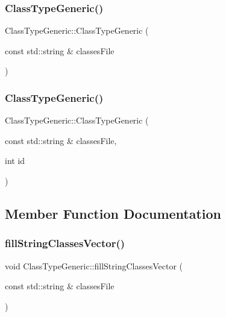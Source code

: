 \subsubsection{\texorpdfstring{Class\+Type\+Generic()}{ClassTypeGeneric()}\hspace{0.1cm}{\footnotesize\ttfamily [1/2]}}
{\footnotesize\ttfamily Class\+Type\+Generic\+::\+Class\+Type\+Generic (\begin{DoxyParamCaption}\item[{const std\+::string \&}]{classes\+File }\end{DoxyParamCaption})}

\mbox{\label{struct_class_type_generic_adee43b8b4a2c707e92aabb8483541c2e}} 
\subsubsection{\texorpdfstring{Class\+Type\+Generic()}{ClassTypeGeneric()}\hspace{0.1cm}{\footnotesize\ttfamily [2/2]}}
{\footnotesize\ttfamily Class\+Type\+Generic\+::\+Class\+Type\+Generic (\begin{DoxyParamCaption}\item[{const std\+::string \&}]{classes\+File,  }\item[{int}]{id }\end{DoxyParamCaption})}



\subsection{Member Function Documentation}
\mbox{\label{struct_class_type_generic_aff4300aa3e2616422062c5ad88f3209a}} 
\subsubsection{\texorpdfstring{fill\+String\+Classes\+Vector()}{fillStringClassesVector()}}
{\footnotesize\ttfamily void Class\+Type\+Generic\+::fill\+String\+Classes\+Vector (\begin{DoxyParamCaption}\item[{const std\+::string \&}]{classes\+File }\end{DoxyParamCaption})}

